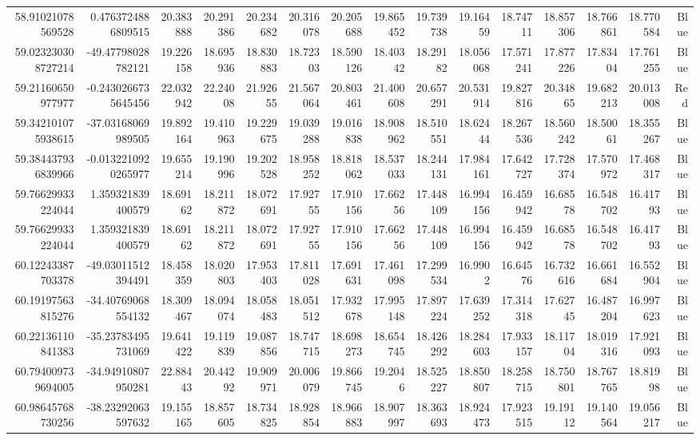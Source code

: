 \begin{center}
\begin{longtable}{rrrrrrrrrrrrrrr}
58.91021078569528 & 0.4763724886809515 & 20.383888 & 20.291386 & 20.234682 & 20.316078 & 20.205688 & 19.865452 & 19.739738 & 19.16459 & 18.74711 & 18.857306 & 18.766861 & 18.770584 & Blue \\
59.023230308727214 & -49.47798028782121 & 19.226158 & 18.695936 & 18.830883 & 18.72303 & 18.590126 & 18.40342 & 18.29182 & 18.056068 & 17.571241 & 17.877226 & 17.83404 & 17.761255 & Blue \\
59.21160650977977 & -0.2430266735645456 & 22.032942 & 22.24008 & 21.92655 & 21.567064 & 20.803461 & 21.400608 & 20.657291 & 20.531914 & 19.827816 & 20.34865 & 19.682213 & 20.013008 & Red \\
59.342101075938615 & -37.03168069989505 & 19.892164 & 19.410963 & 19.229675 & 19.039288 & 19.016838 & 18.908962 & 18.510551 & 18.62444 & 18.267536 & 18.560242 & 18.50061 & 18.355267 & Blue \\
59.384437936839966 & -0.0132210920265977 & 19.655214 & 19.190996 & 19.202528 & 18.958252 & 18.818062 & 18.537033 & 18.244131 & 17.984161 & 17.642727 & 17.728374 & 17.570972 & 17.468317 & Blue \\
59.76629933224044 & 1.359321839400579 & 18.69162 & 18.211872 & 18.072691 & 17.92755 & 17.910156 & 17.66256 & 17.448109 & 16.994156 & 16.459942 & 16.68578 & 16.548702 & 16.41793 & Blue \\
59.76629933224044 & 1.359321839400579 & 18.69162 & 18.211872 & 18.072691 & 17.92755 & 17.910156 & 17.66256 & 17.448109 & 16.994156 & 16.459942 & 16.68578 & 16.548702 & 16.41793 & Blue \\
60.12243387703378 & -49.03011512394491 & 18.458359 & 18.020803 & 17.953403 & 17.811028 & 17.691631 & 17.461098 & 17.299534 & 16.9902 & 16.64576 & 16.732616 & 16.661684 & 16.552904 & Blue \\
60.19197563815276 & -34.40769068554132 & 18.309467 & 18.094074 & 18.058483 & 18.051512 & 17.932678 & 17.995148 & 17.897224 & 17.639252 & 17.314318 & 17.62745 & 16.487204 & 16.997623 & Blue \\
60.22136110841383 & -35.23783495731069 & 19.641422 & 19.119839 & 19.087856 & 18.747715 & 18.698273 & 18.654745 & 18.426292 & 18.284603 & 17.933157 & 18.11704 & 18.019316 & 17.921093 & Blue \\
60.794009739694005 & -34.94910807950281 & 22.88443 & 20.44292 & 19.909971 & 20.006079 & 19.866745 & 19.2046 & 18.525227 & 18.850807 & 18.258715 & 18.750801 & 18.767765 & 18.81998 & Blue \\
60.98645768730256 & -38.23292063597632 & 19.155165 & 18.857605 & 18.734825 & 18.928854 & 18.966883 & 18.907997 & 18.363693 & 18.924473 & 17.923515 & 19.19112 & 19.140564 & 19.056217 & Blue \\

\end{longtable}
\end{center}
